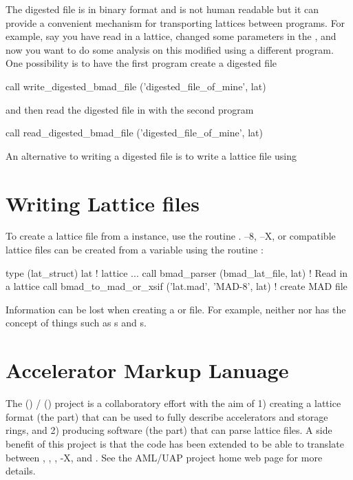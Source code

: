The digested file is in binary format and is not human readable but it
can provide a convenient mechanism for transporting lattices between
programs. For example, say you have read in a lattice, changed
some parameters in the , and now you want to do some
analysis on this modified  using a different program. 
One possibility is to have the first program create a digested file
\begin{example}
  call write_digested_bmad_file ('digested_file_of_mine', lat)
\end{example}
and then read the digested file in with the second program
\begin{example}
  call read_digested_bmad_file ('digested_file_of_mine', lat)
\end{example}
An alternative to writing a digested file is to write a lattice file
using 

\section{Writing Lattice files}
\label{s:lat.write}

To create a \bmad lattice file from a  instance, use the routine
.
\mad--8, \mad--X, or  compatible lattice 
files can be created from a  variable 
using the routine :
\begin{example}
  type (lat_struct) lat             ! lattice
  ...
  call bmad_parser (bmad_lat_file, lat)               ! Read in a lattice
  call bmad_to_mad_or_xsif ('lat.mad', 'MAD-8', lat)  ! create MAD file
\end{example}
Information can be lost when creating a \mad or  file.
For example, neither \mad nor  has the concept of 
things such as s and s.

\section{Accelerator Markup Lanuage}
\label{s:aml}

The  () /  () project\cite{b:aml} is a collaboratory
effort with the aim of 1) creating a lattice format (the  part)
that can be used to fully describe accelerators and storage rings, and
2) producing software (the  part) that can parse 
lattice files. A side benefit of this project is that the  code
has been extended to be able to translate between , \bmad, ,
\mad-X, and . See the AML/UAP project home web page for more details.


